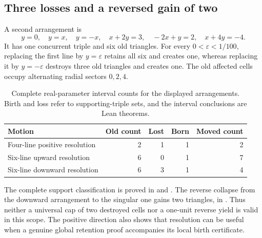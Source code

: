 \subsection{Three losses and a reversed gain of two}
\label{surgery:six}

A second arrangement is
\begin{equation}
 y=0,\quad y=x,\quad y=-x,\quad x+2y=3,\quad
 -2x+y=2,\quad x+4y=-4.
 \label{surgery:six-lines}
\end{equation}
It has one concurrent triple and six old triangles. For every
$0<\varepsilon<1/100$, replacing the first line by $y=\varepsilon$
retains all six and creates one, whereas replacing it by
$y=-\varepsilon$ destroys three old triangles and creates one. The
old affected cells occupy alternating radial sectors $0,2,4$.
\begin{table}[tb]
\centering\small
\begin{tabular}{@{}lrrrr@{}}
\toprule
Motion & Old count & Lost & Born & Moved count\\
\midrule
Four-line positive resolution & 2 & 1 & 1 & 2\\
Six-line upward resolution & 6 & 0 & 1 & 7\\
Six-line downward resolution & 6 & 3 & 1 & 4\\
\bottomrule
\end{tabular}
\caption{Complete real-parameter interval counts for the displayed
arrangements. Birth and loss refer to supporting-triple sets, and the
interval conclusions are Lean theorems.}
\label{surgery:counts}
\end{table}
The complete support classification is proved in
and .
The reverse collapse from the downward arrangement to the singular
one gains two triangles, in
.
Thus neither a universal cap of two destroyed cells nor a one-unit
reverse yield is valid in this scope. The positive direction also shows
that resolution can be useful when a genuine global retention proof
accompanies its local birth certificate.
